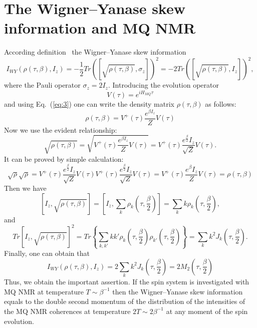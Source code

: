 \documentclass[preprint,12pt]{elsarticle}
\begin{document}
\section{The Wigner--Yanase skew information and MQ NMR}
\label{sec:3}
According definition~\cite{1,2,3} the Wigner--Yanase skew information
\begin{equation}
    \label{eq:14}
        I_{WY}(\rho(\tau,\beta),I_z) = -\frac{1}{2}
            Tr([\sqrt{\rho(\tau,\beta)},\sigma_z])^2 =
                -2Tr([\sqrt{\rho(\tau,\beta)},I_z])^2,
\end{equation}
where the Pauli operator $\sigma_z=2I_z$.
Introducing the evolution operator
\begin{equation}
    \label{eq:15}
        V(\tau) = e^{iH_{MQ}\tau}
\end{equation}
and using Eq.~(\ref{eq:3}) one can write the density matrix $\rho(\tau,\beta)$ as follows:
\begin{equation}
    \label{eq:16}
        \rho(\tau,\beta) = V^+(\tau) \frac{e^{\beta I_z}}{Z}V(\tau)
\end{equation}
Now we use the evident relationship:
\begin{equation}
    \label{eq:17}
        \sqrt{\rho(\tau,\beta)} =
            \sqrt{V^+(\tau)\frac{e^{\beta I_z}}{Z}V(\tau)} =
                V^+(\tau) \frac{e^{\frac{\beta}{2}}I_z}{\sqrt{Z}}V(\tau).
\end{equation}
It can be proved by simple calculation:
\begin{equation}
    \label{eq:18}
        \sqrt{\rho}\sqrt{\rho} =
            V^+(\tau)\frac{e^\frac{\beta}{2}I_z}{\sqrt{Z}}
                V(\tau)V^+(\tau)\frac{e^{\frac{\beta}{2}}I_z}{\sqrt{Z}}V(\tau) =
            V^+(\tau)\frac{e^\beta I_z}{Z}V(\tau) =
        \rho(\tau,\beta)
\end{equation}
%
Then we have
%
\begin{equation} \label{eq:19}
    \left[I_z,\sqrt{\rho(\tau,\beta)}\right]
    = \left[I_z, \sum_k \rho_k \left(\tau, \frac{\beta}{2}\right)\right]
    = \sum_k k\rho_k \left(\tau, \frac{\beta}{2}\right),
\end{equation}
%
and
%
\begin{equation} \label{eq:20}
	Tr\left[I_z,\sqrt{\rho(\tau,\beta)} \right]^2
	= Tr\left\{\sum_{k,k'}kk'
		\rho_k\left(\tau,\frac{\beta}{2}\right)
		\rho_{k'}\left(\tau,\frac{\beta}{2}\right)
	\right\}
	= \sum_k k^2 J_k\left(\tau,\frac{\beta}{2}\right).
\end{equation}
%
Finally, one can obtain that
%
\begin{equation} \label{eq:21}
    I_{WY}\left(\rho(\tau, \beta), I_z\right)
    = 2\sum_k k^2 J_k\left(\tau, \frac{\beta}{2}\right)
    = 2M_2\left(\tau, \frac{\beta}{2}\right)
\end{equation}
%
Thus, we obtain the important assertion.
If the spin system is investigated with MQ NMR at temperature $T\sim\beta^{-1}$ then the Wigner--Yanase skew information equals to the double second momentum of the distribution of the intensities of the MQ NMR coherences at temperature $2T \sim 2\beta^{-1}$ at any moment of the spin evolution.
\end{document}
